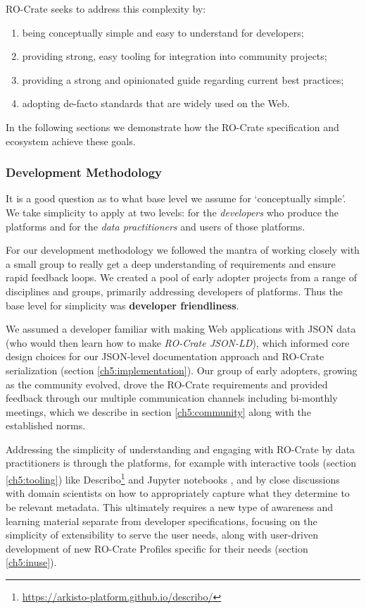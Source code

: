 RO-Crate seeks to address this complexity by:

\begin{enumerate}
  \item[1.] being conceptually simple and easy to understand for developers;
  \item[2.] providing strong, easy tooling for integration into community projects;
  \item[3.] providing a strong and opinionated guide regarding current best practices;
  \item[4.] adopting de-facto standards that are widely used on the Web.
\end{enumerate}

In the following sections we demonstrate how the RO-Crate specification
and ecosystem achieve these goals.

\subsubsection{Development Methodology}\label{ch5:methodology}

It is a good question as to what base level we assume for `conceptually
simple'. We take simplicity to apply at two levels: for the
\emph{developers} who produce the platforms and for the \emph{data
practitioners} and users of those platforms.

For our development methodology we followed the mantra of working
closely with a small group to really get a deep understanding of
requirements and ensure rapid feedback loops. We created a pool of early
adopter projects from a range of disciplines and groups, primarily
addressing developers of platforms. Thus the base level for simplicity
was \textbf{developer friendliness}.

We assumed a developer familiar with making Web applications with JSON
data (who would then learn how to make \emph{RO-Crate JSON-LD}), which
informed core design choices for our JSON-level documentation approach
and RO-Crate serialization (section \vref{ch5:implementation}). Our group of early
adopters, growing as the community evolved, drove the RO-Crate
requirements and provided feedback through our multiple communication
channels including bi-monthly meetings, which we describe in section \vref{ch5:community} along with the established norms.

Addressing the simplicity of understanding and engaging with RO-Crate by
data practitioners is through the platforms, for example with
interactive tools (section \vref{ch5:tooling}) like
Describo\footnote{\url{https://arkisto-platform.github.io/describo/}} \cite{ch5-78} and
Jupyter notebooks
\cite{Kluyver 2016}, and by
close discussions with domain scientists on how to appropriately capture
what they determine to be relevant metadata. This ultimately requires a
new type of awareness and learning material separate from developer
specifications, focusing on the simplicity of extensibility to serve the
user needs, along with user-driven development of new RO-Crate Profiles
specific for their needs (section \vref{ch5:inuse}).

